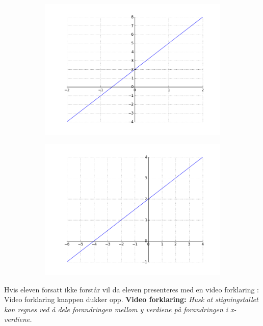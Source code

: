 \documentclass[12pt,twoside,onecolumn]{article}
\begin{document}
\begin{figure}[h!]
\begin{subfigure}{.5\textwidth}
    \includegraphics[scale = 0.5]{figures/3Xp2.png}
    \end{subfigure}%
    \begin{subfigure}{.5\textwidth}
    \centering
    \includegraphics[scale = 0.5]{figures/05Xp2.png}
    \end{subfigure}
\end{figure}
{\color{Maroon}Hvis eleven forsatt ikke forstår vil da eleven presenteres med en video forklaring :  Video forklaring knappen dukker opp.}
\newline
\newline
\textbf{Video forklaring:}
\newline\newline
{\emph{\color{gray}
Husk at stigningstallet kan regnes ved å dele forandringen mellom y verdiene på forandringen i x-verdiene.}} 
\end{document}
